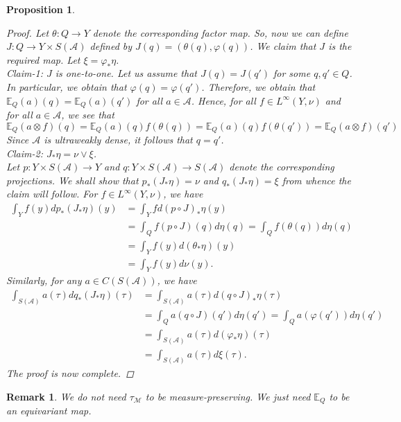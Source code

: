 \documentclass[12pt]{amsart}
\newtheorem{remark}[thm]{Remark}
\newtheorem{proposition}[thm]{Proposition}
\theoremstyle{definition}
\begin{document}
\begin{proposition}
\begin{proof}
Let $\theta: Q\to Y$ denote the corresponding factor map. So, now we can define $J: Q\to Y\times S(\mathcal{A})$ defined by $J(q)=(\theta(q), \varphi(q))$. We claim that $J$ is the required map. Let $\xi=\varphi_*\eta$.\\
\textit{Claim-1: $J$ is one-to-one}. Let us assume that $J(q)=J(q')$ for some $q,q'\in Q$. In particular, we obtain that $\varphi(q)=\varphi(q')$. Therefore, we obtain that  $\mathbb{E}_{Q}(a)(q)=\mathbb{E}_{Q}(a)(q')$ for all $a\in\mathcal{A}$. Hence, for all $f\in L^{\infty}(Y,\nu)$ and for all $a\in\mathcal{A}$, we see that \[\mathbb{E}_{Q}(a\otimes f)(q)=\mathbb{E}_{Q}(a)(q)f(\theta(q))=\mathbb{E}_{Q}(a)(q)f(\theta(q'))=\mathbb{E}_{Q}(a\otimes f)(q')\] 
Since $\mathcal{A}$ is ultraweakly dense, it follows that $q=q'$.\\
\textit{Claim-2:} $J_*\eta=\nu\vee\xi$.\\
Let $p: Y\times S(\mathcal{A})\to Y$ and $q: Y\times S(\mathcal{A})\to S(\mathcal{A})$ denote the corresponding projections. We shall show that $p_*(J_*\eta)=\nu$ and $q_*(J_*\eta)=\xi$ from whence the claim will follow. For $f\in L^{\infty}(Y,\nu)$, we have
\begin{align*}
\int_Yf(y)dp_*(J_*\eta)(y)&=\int_Yfd(p\circ J)_*\eta(y)\\&=\int_Qf(p\circ J)(q)d\eta(q)=\int_Q f(\theta(q))d\eta(q)\\&=\int_Yf(y)d(\theta_*\eta)(y)\\&=\int_Yf(y)d\nu(y).    
\end{align*}
Similarly, for any $a\in C(S(\mathcal{A}))$, we have
\begin{align*}
\int_{S(\mathcal{A})}a(\tau)dq_*(J_*\eta)(\tau)&=\int_{S(\mathcal{A})}a(\tau)d(q\circ J)_*\eta(\tau)\\&=\int_Qa(q\circ J)(q')d\eta(q')=\int_Q a(\varphi(q'))d\eta(q')\\&=\int_{S(\mathcal{A})}a(\tau)d(\varphi_*\eta)(\tau)\\&=\int_{S(\mathcal{A})}a(\tau)d\xi(\tau).    
\end{align*}
The proof is now complete. 
\end{proof}
\end{proposition}
\begin{remark}
We do not need $\tau_{\mathcal{M}}$ to be measure-preserving. We just need $\mathbb{E}_Q$ to be an equivariant map.
\end{remark}
\end{document}
